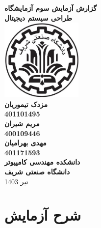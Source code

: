 \documentclass{article}
\begin{document}
\begin{titlepage}
    \begin{center}
        \textbf{\Huge{گزارش آزمایش سوم آزمایشگاه
        \\ طراحی سیستم دیجیتال}}\\
        \vspace{1cm}
        \includegraphics[width=0.3\textwidth]{sharif.jpg}\\
        \vspace{1cm}
        \textbf{ \Large{مزدک تیموریان}}\\
        \vspace{0.4cm}
        \textbf{ \large{401101495}}\\
        \vspace{0.5cm}
        \textbf{ \Large{مریم شیران}}\\
        \vspace{0.4cm}
        \textbf{ \large{400109446}}\\
        \vspace{0.5cm}
        \textbf{ \Large{مهدی بهرامیان}}\\
        \vspace{0.4cm}
        \textbf{ \large{401171593}}\\
        \vspace{1cm}
        \textbf{ \Large{دانشکده مهندسی کامپیوتر}}\\
        \vspace{0.4cm}
        \textbf{ \Large{دانشگاه صنعتی شریف}}\\
        \vspace{0.6cm}
        \large{تیر 1403}
    \end{center}
    \thispagestyle{empty}
\end{titlepage}

\tableofcontents

\newpage

\section{شرح آزمایش}
\end{document}
